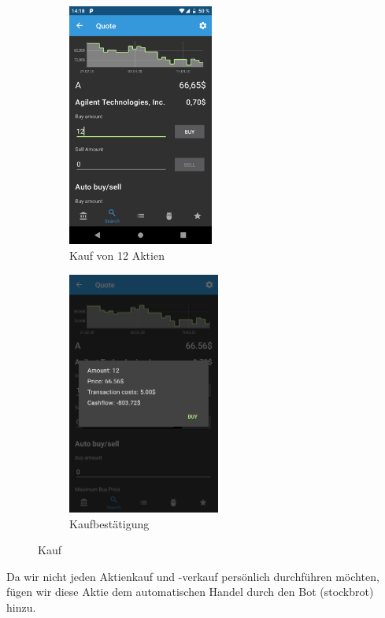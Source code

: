\documentclass[a4paper]{article}
\begin{document}
\begin{figure}[H]
	\begin{subfigure}{.5\textwidth}
		\centering
		\includegraphics[height=8cm,keepaspectratio]{./images/demo/buy_a.png}
		\caption{Kauf von 12 Aktien}
		\label{fig:demo:buy_a}
	\end{subfigure}
	\begin{subfigure}{.5\textwidth}
		\centering
		\includegraphics[height=8cm,keepaspectratio]{./images/demo/buy_a_confirm.png}
		\caption{Kaufbestätigung}
		\label{fig:demo:buy_a_confirm}
	\end{subfigure}
	\caption{Kauf}
	\label{fig:demo:buy}
\end{figure}

Da wir nicht jeden Aktienkauf und -verkauf persönlich durchführen möchten, fügen wir diese Aktie dem automatischen Handel durch den Bot (stockbrot) hinzu. 
\end{document}
